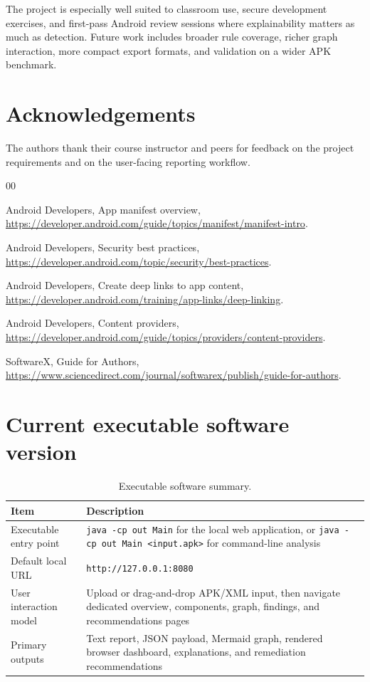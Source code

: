 \documentclass[preprint,12pt,a4paper]{elsarticle}
\begin{document}
The project is especially well suited to classroom use, secure development exercises, and first-pass Android review sessions where explainability matters as much as detection. Future work includes broader rule coverage, richer graph interaction, more compact export formats, and validation on a wider APK benchmark.

\section*{Acknowledgements}

The authors thank their course instructor and peers for feedback on the project requirements and on the user-facing reporting workflow.

\begin{thebibliography}{00}

Android Developers, App manifest overview, \url{https://developer.android.com/guide/topics/manifest/manifest-intro}.

Android Developers, Security best practices, \url{https://developer.android.com/topic/security/best-practices}.

Android Developers, Create deep links to app content, \url{https://developer.android.com/training/app-links/deep-linking}.

Android Developers, Content providers, \url{https://developer.android.com/guide/topics/providers/content-providers}.

SoftwareX, Guide for Authors, \url{https://www.sciencedirect.com/journal/softwarex/publish/guide-for-authors}.

\end{thebibliography}

\section*{Current executable software version}

\begin{table}[H]
\centering
\begin{tabular}{|l|p{12cm}|}
\hline
\textbf{Item} & \textbf{Description} \\
\hline
Executable entry point & \texttt{java -cp out Main} for the local web application, or \texttt{java -cp out Main <input.apk>} for command-line analysis \\
\hline
Default local URL & \texttt{http://127.0.0.1:8080} \\
\hline
User interaction model & Upload or drag-and-drop APK/XML input, then navigate dedicated overview, components, graph, findings, and recommendations pages \\
\hline
Primary outputs & Text report, JSON payload, Mermaid graph, rendered browser dashboard, explanations, and remediation recommendations \\
\hline
\end{tabular}
\caption{Executable software summary.}
\label{tab:exec}
\end{table}
\end{document}
